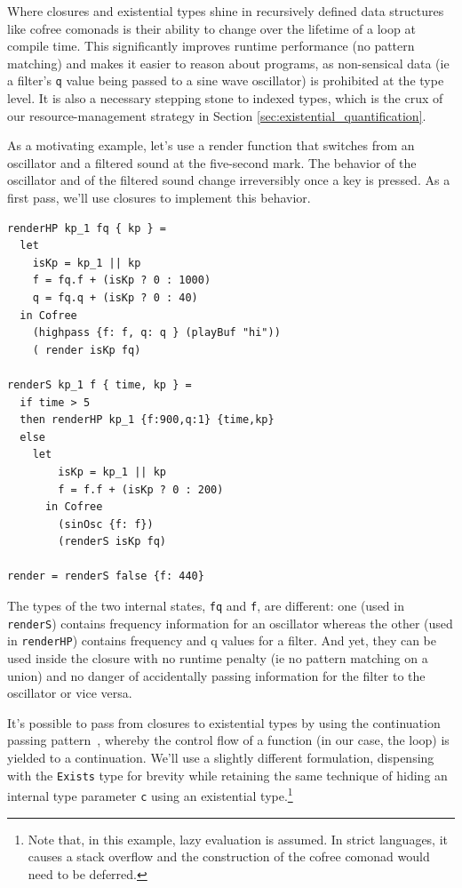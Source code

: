\documentclass{article}
\begin{document}
Where closures and existential types shine in recursively defined data structures like cofree comonads is their ability to change over the lifetime of a loop at compile time. This significantly improves runtime performance (no pattern matching) and makes it easier to reason about programs, as non-sensical data (ie a filter's \texttt{q} value being passed to a sine wave oscillator) is prohibited at the type level. It is also a necessary stepping stone to indexed types, which is the crux of our resource-management strategy in Section \ref{sec:existential_quantification}.

As a motivating example, let's use a render function that switches from an oscillator and a filtered sound at the five-second mark. The behavior of the oscillator and of the filtered sound change irreversibly once a key is pressed. As a first pass, we'll use closures to implement this behavior.

\lstset{language=Haskell, style=psstyle}
\begin{lstlisting}
renderHP kp_1 fq { kp } =
  let
    isKp = kp_1 || kp
    f = fq.f + (isKp ? 0 : 1000)
    q = fq.q + (isKp ? 0 : 40)
  in Cofree
    (highpass {f: f, q: q } (playBuf "hi"))
    ( render isKp fq)

renderS kp_1 f { time, kp } =
  if time > 5
  then renderHP kp_1 {f:900,q:1} {time,kp}
  else
    let
        isKp = kp_1 || kp
        f = f.f + (isKp ? 0 : 200)
      in Cofree
        (sinOsc {f: f})
        (renderS isKp fq)

render = renderS false {f: 440}
\end{lstlisting}

The types of the two internal states, \texttt{fq} and \texttt{f}, are different: one (used in \texttt{renderS}) contains frequency information for an oscillator whereas the other (used in \texttt{renderHP}) contains frequency and q values for a filter. And yet, they can be used inside the closure with no runtime penalty (ie no pattern matching on a union) and no danger of accidentally passing information for the filter to the oscillator or vice versa.

It's possible to pass from closures to existential types by using the continuation passing pattern~\cite{sussman14ai}, whereby the control flow of a function (in our case, the loop) is yielded to a continuation. We'll use a slightly different formulation, dispensing with the \texttt{Exists} type for brevity while retaining the same technique of hiding an internal type parameter \texttt{c} using an existential type.\footnote{Note that, in this example, lazy evaluation is assumed. In strict languages, it causes a stack overflow and the construction of the cofree comonad would need to be deferred.}
\end{document}
